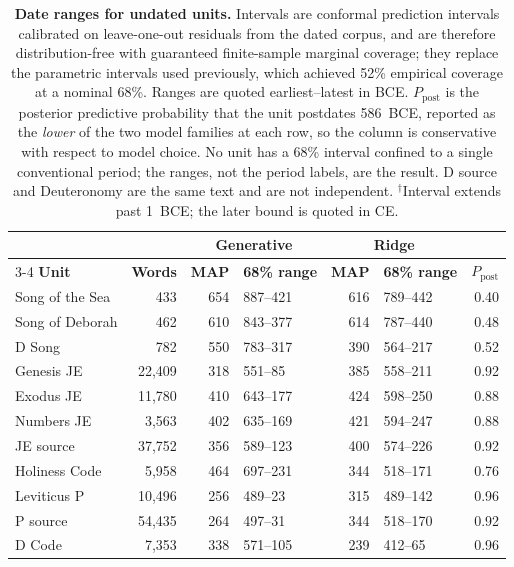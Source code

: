 \begin{table}[!ht]
\centering
\caption{\textbf{Date ranges for undated units.}  Intervals are
conformal prediction intervals calibrated on leave-one-out residuals
from the dated corpus, and are therefore distribution-free with
guaranteed finite-sample marginal coverage; they replace the parametric
intervals used previously, which achieved 52\% empirical coverage at a
nominal 68\%.  Ranges are quoted earliest--latest in BCE.  $P_{\mathrm{post}}$
is the posterior predictive probability that the unit postdates 586~BCE,
reported as the \emph{lower} of the two model families at each row, so
the column is conservative with respect to model choice.
No unit has a 68\% interval confined to a single conventional period;
the ranges, not the period labels, are the result.  D source and
Deuteronomy are the same text and are not independent.
$^\dagger$Interval extends past 1~BCE; the later bound is quoted in CE.}
\begin{tabular}{lrrlrlr}
\hline
 & & \multicolumn{2}{c}{\textbf{Generative}} & \multicolumn{2}{c}{\textbf{Ridge}} & \\
\cline{3-4}\cline{5-6}
\textbf{Unit} & \textbf{Words} & \textbf{MAP} & \textbf{68\% range} & \textbf{MAP} & \textbf{68\% range} & \textbf{$P_{\mathrm{post}}$} \\
\hline
Song of the Sea     & 433 & 654 & 887--421 & 616 & 789--442 & 0.40 \\
Song of Deborah     & 462 & 610 & 843--377 & 614 & 787--440 & 0.48 \\
D Song              & 782 & 550 & 783--317 & 390 & 564--217 & 0.52 \\
Genesis JE          & 22{,}409 & 318 & 551--85 & 385 & 558--211 & 0.92 \\
Exodus JE           & 11{,}780 & 410 & 643--177 & 424 & 598--250 & 0.88 \\
Numbers JE          & 3{,}563 & 402 & 635--169 & 421 & 594--247 & 0.88 \\
JE source           & 37{,}752 & 356 & 589--123 & 400 & 574--226 & 0.92 \\
Holiness Code       & 5{,}958 & 464 & 697--231 & 344 & 518--171 & 0.76 \\
Leviticus P         & 10{,}496 & 256 & 489--23 & 315 & 489--142 & 0.96 \\
P source            & 54{,}435 & 264 & 497--31 & 344 & 518--170 & 0.92 \\
D Code              & 7{,}353 & 338 & 571--105 & 239 & 412--65 & 0.96 \\

\end{tabular}
\end{table}
